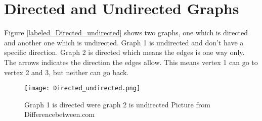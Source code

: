 \section{Directed and Undirected Graphs}
Figure \cref{labeled_Directed_undirected} shows two graphs, one which is directed and another one which is undirected. Graph 1 is undirected and don't have a specific direction. Graph 2 is directed which means the edges is one way only. The arrows indicates the direction the edges allow. This means vertex 1 can go to vertex 2 and 3, but neither can go back. 


\begin{figure}[ht!]
    \centering
    \texttt{[image: Directed\_undirected.png]}
    \label{fig:labeled_Directed_undirected}
    \caption{Graph 1 is directed were graph 2 is undirected \newline Picture from Differencebetween.com\cite{dir_pic}}
  \end{figure}